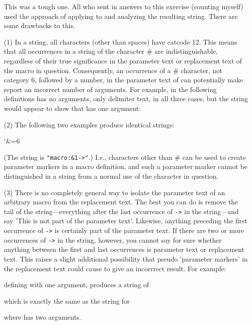 
This was a tough one. All who sent in answers to this exercise
(counting myself) used the approach of applying \cmd{\meaning} to \cmd{\foo} and
analyzing the resulting string. There are some drawbacks to this.

(1) In a \cmd{\meaning} string, all characters (other than spaces) have
catcode 12. This means that all occurrences in a \cmd{\meaning} string of
the character \# are indistinguishable, regardless of their true
significance in the parameter text or replacement text of the macro
in question. Consequently, an occurrence of a \# character, not
category 6, followed by a number, in the parameter text of \cmd{\foo} can
potentially make \cmd{\args} report an incorrect number of arguments. For
example, in the following definitions \cmd{\foo} has no arguments, only
delimiter text, in all three cases, but the \cmd{\meaning} string would
appear to show that \cmd{\foo} has one argument:

(2) The following two examples produce identical \cmd{\meaning} strings:
\begin{lcode}
  \def\foo&1{} %
  \catcode`\&=6 \def\foo&1{} %
\end{lcode}

(The string is \verb?"macro:&1->"?.) I.e., characters other than \# can
be used to create parameter markers in a macro definition, and
such a parameter marker cannot be distinguished in a \cmd{\meaning}
string from a normal use of the character in question.

(3) There is no completely general way to isolate the parameter text
of an arbitrary macro from the replacement text. The best you can do
is remove the tail of the \cmd{\meaning} string---everything after the last
occurrence of \verb?->? in the string---and say 'This is not part of the
parameter text'. Likewise, anything preceding the first occurrence of
\verb?->? is certainly part of the parameter text. If there are two or more
occurrences of \verb?->? in the string, however, you cannot say for sure
whether anything between the first and last occurrences is parameter
text or replacement text. This raises a slight additional possibility
that pseudo 'parameter markers' in the replacement text could cause
\cmd{\args} to give an incorrrect result. For example:
defining \cmd{\foo} with one argument, produces a \cmd{\meaning} string of
which is exactly the same as the \cmd{\meaning} string for
\begin{lcode}
  \def\foo#1->#2{}
\end{lcode}
where \cmd{\foo} has two arguments.


